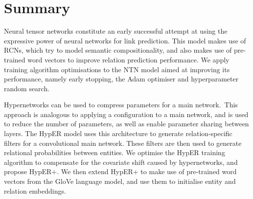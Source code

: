 \bigskip



\section{Summary}

Neural tensor networks constitute an early successful attempt at using the expressive power of neural networks for link prediction. This model makes use of RCNs, which try to model semantic compositionality, and also makes use of pre-trained word vectors to improve relation prediction performance. We apply training algorithm optimisations to the NTN model aimed at improving its performance, namely early stopping, the Adam optimiser and hyperparameter random search. \par

\noindent Hypernetworks can be used to compress parameters for a main network.\ This approach is analogous to applying a configuration to a main network, and is used to reduce the number of parameters, as well as enable parameter sharing between layers. The HypER model uses this architecture to generate relation-specific filters for a convolutional main network. These filters are then used to generate relational probabilities between entities. We optimise the HypER training algorithm to compensate for the covariate shift caused by hypernetworks, and propose HypER+. We then extend HypER+ to make use of pre-trained word vectors from the GloVe language model, and use them to initialise entity and relation embeddings. 
